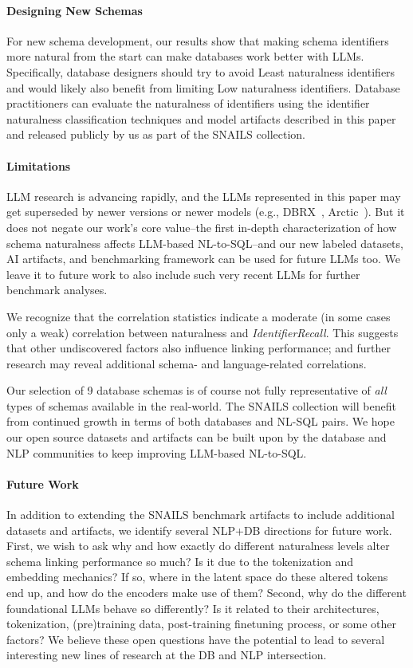 \paragraph{\textbf{Designing New Schemas}}
For new schema development, our results show that making schema identifiers more natural from the start can make databases work better with LLMs.
Specifically, database designers should try to avoid Least naturalness identifiers and would likely also benefit from limiting Low naturalness identifiers.
Database practitioners can evaluate the naturalness of identifiers using the identifier naturalness classification techniques and model artifacts described in this paper and released publicly by us as part of the SNAILS collection.

\paragraph{\textbf{Limitations}}
LLM research is advancing rapidly, and the LLMs represented in this paper may get superseded by newer versions or newer models (e.g., DBRX~\cite{dbrx}, Arctic~\cite{snowflakearctic}).
But it does not negate our work's core value--the first in-depth characterization of how schema naturalness affects LLM-based NL-to-SQL--and our new labeled datasets, AI artifacts, and benchmarking framework can be used for future LLMs too.
We leave it to future work to also include such very recent LLMs for further benchmark analyses.

We recognize that the correlation statistics indicate a moderate (in some cases only a weak) correlation between naturalness and \emph{IdentifierRecall}.
This suggests that other undiscovered factors also influence linking performance; and further research may reveal additional schema- and language-related correlations.

Our selection of 9 database schemas is of course not fully representative of \emph{all} types of schemas available in the real-world.
The SNAILS collection will benefit from continued growth in terms of both databases and NL-SQL pairs.
We hope our open source datasets and artifacts can be built upon by the database and NLP communities to keep improving LLM-based NL-to-SQL.

\paragraph{\textbf{Future Work}}
In addition to extending the SNAILS  benchmark artifacts to include additional datasets and artifacts, we identify several NLP+DB directions for future work.
First, we wish to ask why and how exactly do different naturalness levels alter schema linking performance so much?
Is it due to the tokenization and embedding mechanics?
If so, where in the latent space do these altered tokens end up, and how do the encoders make use of them?
Second, why do the different foundational LLMs behave so differently?
Is it related to their architectures, tokenization, (pre)training data, post-training finetuning process, or some other factors?
We believe these open questions have the potential to lead to several interesting new lines of research at the DB and NLP intersection.



